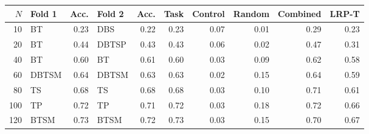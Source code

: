 \begin{tabular}{@{}rlrlrrrrrr@{}}
\toprule
$N$ & Fold 1 & Acc. & Fold 2 & Acc. & Task & Control & Random & Combined & LRP-T \\
\midrule
10 & BT & 0.23 & DBS & 0.22 & 0.23 & 0.07 & 0.01 & 0.29 & 0.23 \\
20 & BT & 0.44 & DBTSP & 0.43 & 0.43 & 0.06 & 0.02 & 0.47 & 0.31 \\
40 & BT & 0.60 & BT & 0.61 & 0.60 & 0.03 & 0.09 & 0.62 & 0.58 \\
60 & DBTSM & 0.64 & DBTSM & 0.63 & 0.63 & 0.02 & 0.15 & 0.64 & 0.59 \\
80 & TS & 0.68 & TS & 0.68 & 0.68 & 0.03 & 0.10 & 0.71 & 0.61 \\
100 & TP & 0.72 & TP & 0.71 & 0.72 & 0.03 & 0.18 & 0.72 & 0.66 \\
120 & BTSM & 0.73 & BTSM & 0.72 & 0.73 & 0.03 & 0.15 & 0.70 & 0.67 \\
\bottomrule
\end{tabular}
